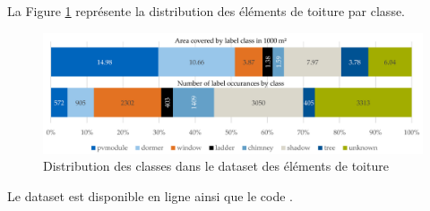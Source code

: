 \par{La Figure \ref{fig:rid_dataset_distribution_classes} représente la distribution des éléments de toiture par classe.}
\begin{figure}[H]
    \centering
    \includegraphics[width=1\linewidth]{02-main//figures/ch2/rid_dataset_distribution_classes.png}
    \caption{Distribution des classes dans le dataset des éléments de toiture \cite{krapf_ridroof_2022}}
    \label{fig:rid_dataset_distribution_classes}
\end{figure}
\par{Le dataset est disponible en ligne \cite{krapf_rid_2021} ainsi que le code \cite{krapf_tumftmrid_2025}.}

